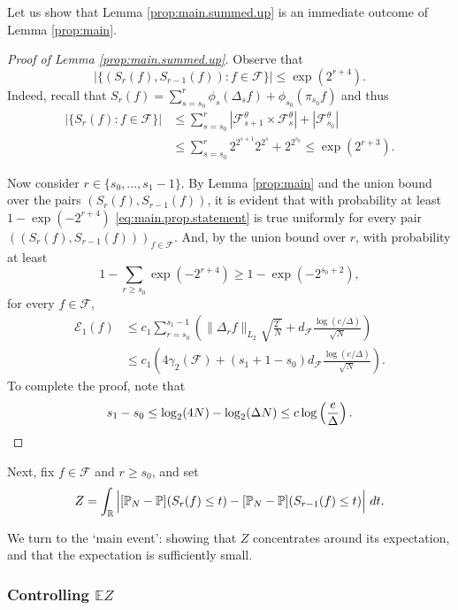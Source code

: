 \documentclass[11pt]{amsart}
\newcommand{\R}{\mathbb{R}}
\theoremstyle{definition}
\newcommand{\E}{\mathbb{E}}
\renewcommand{\P}{\mathbb{P}}
\numberwithin{equation}{section}
\begin{document}
Let us show that Lemma \ref{prop:main.summed.up} is an immediate outcome of Lemma \ref{prop:main}.

\begin{proof}[Proof of Lemma \ref{prop:main.summed.up}]
Observe that
\[|\{ (S_{r}(f),S_{r-1}(f)) : f\in\mathcal{F} \}| \leq \exp(2^{r+4}) .\]
Indeed, recall that  $S_{r}(f) =  \sum_{s=s_{0}}^{r} \phi_{s}(\Delta_{s}f)  + \phi_{s_{0}}(\pi_{s_{0}}f) $ and thus
\begin{align*}
 |\{ S_{r}(f) : f\in\mathcal{F}\}|
&\leq  \sum_{s=s_{0}}^{r}  | \mathcal{F}_{s+1}^{\theta}\times \mathcal{F}_{s}^{\theta}| +  |\mathcal{F}_{s_{0}}^{\theta}|  \\
&\leq    \sum_{s=s_{0}}^{r}   2^{2^{s+1}} 2^{2^{s}}   + 2^{2^{s_{0}}}
\leq \exp(2^{r+3}).
\end{align*}

Now consider $r\in \{s_{0},\dots,s_{1}-1\}$.
By Lemma \ref{prop:main} and the union bound over the pairs $(S_{r}(f),S_{r-1}(f))$, it is evident that with probability at least $1-\exp(-2^{r+4})$  \eqref{eq:main.prop.statement} is true uniformly for every pair $((S_{r}(f),S_{r-1}(f)))_{f\in\mathcal{F}}$.
And, by the union bound over $r$, with probability at least 
\[ 1-\sum_{r\geq s_{0}} \exp(-2^{r+4})
\geq 1-\exp(-2^{s_{0}+2}),\]
for every $f\in\mathcal{F}$, 
\begin{align*}
 \mathcal{E}_{1}(f)
&\leq c_{1} \sum_{r=s_{0}}^{s_{1}  -1}\left(  \|\Delta_{r} f\|_{L_{2}}  \sqrt{\frac{2^{r}}{N}}  + d_{\mathcal{F}}\frac{  \log (e/\Delta)}{\sqrt N} \right)\\
&\leq c_{1} \left( 4 \gamma_{2}(\mathcal{F}) + (s_{1}+1 -s_{0})d_{\mathcal{F}} \frac{  \log (e/\Delta)}{\sqrt N}  \right).
\end{align*}
To complete the proof, note that 
\[ s_{1}-s_{0} \leq \log_{2}(4N) - \log_{2}(\Delta N) 
\leq c \log \left( \frac{e}{\Delta} \right) .\qedhere\]
\end{proof}


Next, fix $f\in\mathcal{F}$ and $r\geq s_{0}$, and set
\[Z =\int_{\R} \left|  \vphantom{\P^{(a)}}  [\P_{N}-\P]( S_{r}(f) \leq t)  - [\P_{N}-\P]( S_{r-1}(f) \leq t) \right| \,dt .\]

We turn to the `main event':
showing that $Z$ concentrates around its expectation, and that the expectation is sufficiently small.


\subsubsection{Controlling $\E Z$}
\end{document}

